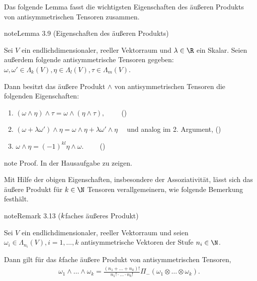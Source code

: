 \documentclass[letterpaper,10pt,german]{jupyterBook}
\begin{document}
\sphinxAtStartPar
Das folgende Lemma fasst die wichtigsten Eigenschaften des äußeren Produkts von antisymmetrischen Tensoren zusammen.
\label{vektoranalysis/tensor:lemma-35}
\begin{sphinxadmonition}{note}{Lemma 3.9 (Eigenschaften des äußeren Produkts)}



\sphinxAtStartPar
Sei \(V\) ein endlich\sphinxhyphen{}dimensionaler, reeller Vektorraum und \(\lambda \in \R\) ein Skalar.
Seien außerdem folgende antisymmetrische Tensoren gegeben: \(\omega, \omega' \in \Lambda_k(V), \eta \in \Lambda_l(V), \tau \in \Lambda_m(V)\).

\sphinxAtStartPar
Dann besitzt das äußere Produkt \(\wedge\) von antisymmetrischen Tensoren die folgenden Eigenschaften:
\begin{enumerate}
%
\item {} 
\sphinxAtStartPar
\((\omega \wedge \eta) \wedge \tau = \omega \wedge (\eta \wedge \tau), \qquad \) ()

\item {} 
\sphinxAtStartPar
\((\omega + \lambda \omega') \wedge \eta = \omega \wedge \eta + \lambda \omega' \wedge \eta\quad\) und analog im 2. Argument, ()

\item {} 
\sphinxAtStartPar
\(\omega \wedge \eta = (-1)^{kl} \eta \wedge \omega. \qquad\) ()

\end{enumerate}
\end{sphinxadmonition}

\begin{sphinxadmonition}{note}
\sphinxAtStartPar
Proof. In der Hausaufgabe zu zeigen.
\end{sphinxadmonition}

\sphinxAtStartPar
Mit Hilfe der obigen Eigenschaften, insbesondere der Assoziativität, lässt sich das äußere Produkt für \(k \in \N\) Tensoren verallgemeinern, wie folgende Bemerkung festhält.
\label{vektoranalysis/tensor:remark-36}
\begin{sphinxadmonition}{note}{Remark 3.13 (\protect\(k\protect\)\sphinxhyphen{}faches äußeres Produkt)}



\sphinxAtStartPar
Sei \(V\) ein endlich\sphinxhyphen{}dimensionaler, reeller Vektorraum und seien \(\omega_i \in \Lambda_{n_i}(V), i=1,\ldots,k\) antisymmetrische Vektoren der Stufe \(n_i \in \N\).

\sphinxAtStartPar
Dann gilt für das \(k\)\sphinxhyphen{}fache äußere Produkt von antisymmetrischen Tensoren,
\begin{equation}\label{equation:vektoranalysis/tensor:eq:kfachesProdukt}
\begin{split}\omega_1 \wedge \ldots \wedge \omega_k = \frac{(n_1 + \ldots + n_k)!}{n_1!\cdot \ldots \cdot n_k!} \Pi_-(\omega_1 \otimes \ldots \otimes \omega_k).\end{split}
\end{equation}\end{sphinxadmonition}
\end{document}
